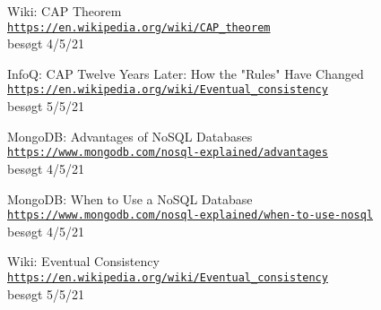 \begin{thebibliography}{x}
    Wiki: CAP Theorem 
    \\\texttt{\url{https://en.wikipedia.org/wiki/CAP_theorem}}
    \\besøgt 4/5/21

    InfoQ: CAP Twelve Years Later: How the "Rules" Have Changed
    \\\texttt{\url{https://en.wikipedia.org/wiki/Eventual_consistency}}
    \\besøgt 5/5/21

    MongoDB: Advantages of NoSQL Databases
    \\\texttt{\url{https://www.mongodb.com/nosql-explained/advantages}}
    \\besøgt 4/5/21

    MongoDB: When to Use a NoSQL Database
    \\\texttt{\url{https://www.mongodb.com/nosql-explained/when-to-use-nosql}}
    \\besøgt 4/5/21

    Wiki: Eventual Consistency
    \\\texttt{\url{https://en.wikipedia.org/wiki/Eventual_consistency}}
    \\besøgt 5/5/21
\end{thebibliography}



